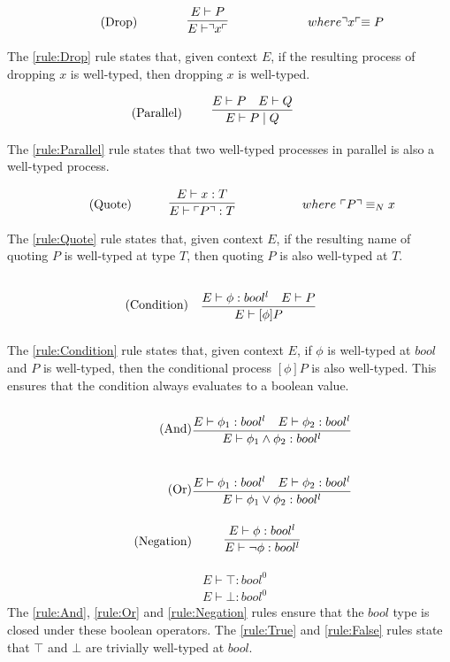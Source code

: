 \begin{align*}
    \tag{Drop}\label{rule:Drop} &\infrule{E \vdash P}{E\vdash \drop{x}}& where \drop{x} \equiv P
\end{align*}
The \ref{rule:Drop} rule states that, given context $E$, if the resulting process of dropping $x$ is well-typed, then dropping $x$ is well-typed.

\begin{align*}
    \tag{Parallel}\label{rule:Parallel} &\infrule{E\vdash P \quad E \vdash Q}{E \vdash P \para Q}
\end{align*}
The \ref{rule:Parallel} rule states that two well-typed processes in parallel is also a well-typed process.

\begin{align*}
    \tag{Quote}\label{rule:Quote} &\infrule{E \vdash x:T}{E\vdash \quot{P}:T}& where\ \quot{P} \equiv_N x
\end{align*}
The \ref{rule:Quote} rule states that, given context $E$, if the resulting name of quoting $P$ is well-typed at type $T$, then quoting $P$ is also well-typed at $T$.

\begin{align*}
    \tag{Condition}\label{rule:Condition} &\infrule{E\vdash \phi:bool^l\quad E\vdash P}{E \vdash [\phi] P}
\end{align*}
The \ref{rule:Condition} rule states that, given context $E$, if $\phi$ is well-typed at $bool$ and $P$ is well-typed, then the conditional process $[\phi]P$ is also well-typed. This ensures that the condition always evaluates to a boolean value.
\begin{align*}
    \tag{And}\label{rule:And} &\infrule{E\vdash \phi_1:bool^l\quad E\vdash \phi_2:bool^l}{E\vdash \phi _1 \land \phi _2:bool^{l}}\\
    \tag{Or}\label{rule:Or} &\infrule{E\vdash \phi_1:bool^l\quad E\vdash \phi_2:bool^l}{E\vdash \phi _1 \lor \phi _2:bool^{l}}\\
    \tag{Negation}\label{rule:Negation} &\infrule{E\vdash \phi :bool^l }{E\vdash \neg \phi :bool^l}
\end{align*}
\begin{align*}
    \tag{True}\label{rule:True} &E\vdash\top:bool^0\\
    \tag{False}\label{rule:False} &E\vdash\bot:bool^0
\end{align*}
The \ref{rule:And}, \ref{rule:Or} and \ref{rule:Negation} rules ensure that the $bool$ type is closed under these boolean operators. The \ref{rule:True} and \ref{rule:False} rules state that $\top$ and $\bot$ are trivially well-typed at $bool$.

